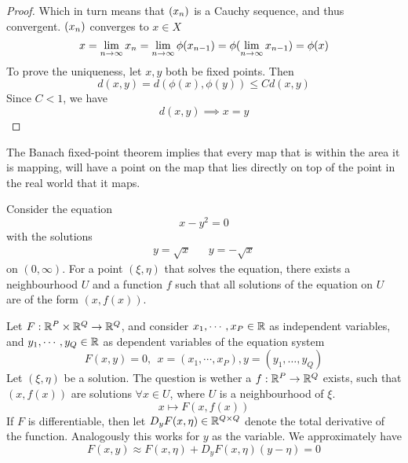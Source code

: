\documentclass[../../script.tex]{subfiles}
\begin{document}
\begin{proof}
    Which in turn means that $\left(x_n\right)$ is a Cauchy sequence, and thus convergent. $\left(x_n\right)$ converges to $x \in X$
    \begin{equation}
        x = \lim_{n \rightarrow \infty} x_n = \lim_{n \rightarrow \infty} \phi(x_{n - 1}) = \phi(\lim_{n \rightarrow \infty} x_{n-1}) = \phi(x)
    \end{equation}
    To prove the uniqueness, let $x, y$ both be fixed points. Then 
    \begin{equation}
        d(x, y) = d(\phi(x), \phi(y)) \le C d(x, y)
    \end{equation}
    Since $C < 1$, we have
    \begin{equation}
        d(x, y) \implies x = y
    \end{equation}
\end{proof}

\begin{rem}
The Banach fixed-point theorem implies that every map that is within the area it is mapping, 
will have a point on the map that lies directly on top of the point in the real world that it maps. 
\end{rem}

\begin{eg}
    Consider the equation 
    \[
        x - y^2 = 0
    \]
    with the solutions 
    \begin{align*}
        y = \sqrt{x} && y = -\sqrt{x}
    \end{align*}
    on $(0, \infty)$.
    For a point $(\xi, \eta)$ that solves the equation, there exists a neighbourhood $U$ and a function $f$ such that 
    all solutions of the equation on $U$ are of the form $(x, f(x))$.
\end{eg}

\begin{rem}
    Let $F: \mathbb{R}^P \times \mathbb{R}^Q \rightarrow \mathbb{R}^Q$, and consider $x_1, \cdots, x_P \in \mathbb{R}$ as independent variables, and
    $y_1, \cdots, y_Q \in \mathbb{R}$ as dependent variables of the equation system
    \[
        F(x, y) = 0, ~~x = (x_1, \cdots, x_P), y = (y_1, \dots, y_Q)
    \]
    Let $(\xi, \eta)$ be a solution. The question is wether a $f: \mathbb{R}^P \rightarrow \mathbb{R}^Q$ exists, such that $(x, f(x))$ are solutions $\forall x \in U$,
    where $U$ is a neighbourhood of $\xi$.
    \[
        x \longmapsto F(x, f(x))
    \]
    If $F$ is differentiable, then let $D_y F(x, \eta) \in \mathbb{R}^{Q \times Q}$ denote the total derivative of the function. Analogously this works for $y$ as the variable.
    We approximately have
    \[
        F(x, y) \approx F(x, \eta) + D_y F(x, \eta)(y - \eta) = 0
    \]
\end{rem}
\end{document}
